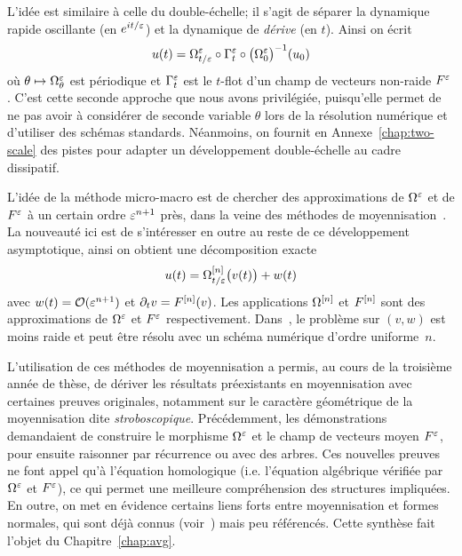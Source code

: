 %
%
L'idée est similaire à celle du double-échelle; il s'agit de séparer la dynamique rapide oscillante (en $e^{it/\varepsilon}$) et la dynamique de \textit{dérive} (en $t$). Ainsi on écrit 
\begin{equation*}
    u(t) = \Omega^\varepsilon_{t/\varepsilon} \circ \Gamma^\varepsilon_t \circ \big( \Omega^\varepsilon_0 \big)^{-1} (u_0)
\end{equation*}
où $\theta \mapsto \Omega^\varepsilon_\theta$ est périodique et $\Gamma^\varepsilon_t$ est le $t$-flot d'un champ de vecteurs non-raide $F^\varepsilon$. C'est cette seconde approche que nous avons privilégiée, puisqu'elle permet de ne pas avoir à considérer de seconde variable $\theta$ lors de la résolution numérique et d'utiliser des schémas standards. Néanmoins, on fournit en Annexe~\ref{chap:two-scale} des pistes pour adapter un développement double-échelle au cadre dissipatif. 

L'idée de la méthode micro-macro est de chercher des approximations de $\Omega^\varepsilon$ et de $F^\varepsilon$ à un certain ordre $\varepsilon^{n+1}$ près, dans la veine des méthodes de moyennisation~\cite{perko.1969.higher,lochak.1988.multiphase,sanders.2007.averaging,chartier.2010.higher,chartier.2012.formal,castella.2015.stroboscopic}. La nouveauté ici est de s'intéresser en outre au reste de ce développement asymptotique, ainsi on obtient une décomposition exacte 
\begin{equation*}
    u(t) = \Omega^{[n]}_{t/\varepsilon} \big( v(t) \big) + w(t)
\end{equation*}
avec $w(t) = \mathcal{O}(\varepsilon^{n+1})$ et $\partial_t v = F^{[n]}(v)$. Les applications $\Omega^{[n]}$ et $F^{[n]}$ sont des approximations de $\Omega^\varepsilon$ et $F^\varepsilon$ respectivement. Dans~\cite{chartier.2020.new}, le problème sur $(v,w)$ est moins raide et peut être résolu avec un schéma numérique d'ordre uniforme~$n$. 


L'utilisation de ces méthodes de moyennisation a permis, au cours de la troisième année de thèse, de dériver les résultats préexistants en moyennisation avec certaines preuves originales, notamment sur le caractère géométrique de la moyennisation dite \textit{stroboscopique}. Précédemment, les démonstrations demandaient de construire le morphisme $\Omega^\varepsilon$ et le champ de vecteurs moyen $F^\varepsilon$, pour ensuite raisonner par récurrence ou avec des arbres. Ces nouvelles preuves ne font appel qu'à l'équation homologique (i.e. l'équation algébrique vérifiée par $\Omega^\varepsilon$ et $F^\varepsilon$), ce qui permet une meilleure compréhension des structures impliquées. En outre, on met en évidence certains liens forts entre moyennisation et formes normales, qui sont déjà connus (voir~\cite{sanders.2007.averaging}) mais peu référencés. Cette synthèse fait l'objet du Chapitre~\ref{chap:avg}. 


